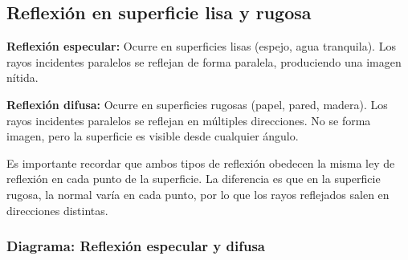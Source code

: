 \subsection{Reflexión en superficie lisa y rugosa}

\begin{seccion}
\begin{definicion}
\textbf{Reflexión especular:} Ocurre en superficies lisas (espejo, agua tranquila). Los rayos incidentes paralelos se reflejan de forma paralela, produciendo una imagen nítida.
\end{definicion}

\begin{definicion}
\textbf{Reflexión difusa:} Ocurre en superficies rugosas (papel, pared, madera). Los rayos incidentes paralelos se reflejan en múltiples direcciones. No se forma imagen, pero la superficie es visible desde cualquier ángulo.
\end{definicion}

Es importante recordar que ambos tipos de reflexión obedecen la misma ley de reflexión en cada punto de la superficie. La diferencia es que en la superficie rugosa, la normal varía en cada punto, por lo que los rayos reflejados salen en direcciones distintas.
\end{seccion}

\subsubsection{Diagrama: Reflexión especular y difusa}

